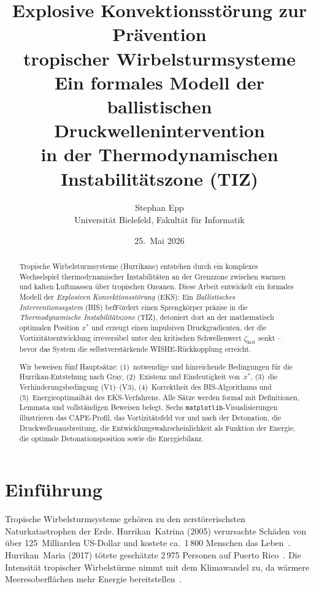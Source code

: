 ﻿\documentclass[a4paper,12pt]{article}
\title{\textbf{Explosive Konvektionsst\"{o}rung zur Pr\"{a}vention\\
tropischer Wirbelsturmsysteme}\\[0.6em]
\large Ein formales Modell der ballistischen Druckwellenintervention\\
in der Thermodynamischen Instabilit\"{a}tszone (TIZ)}
\author{Stephan Epp\\[0.3em]
\small Universit\"{a}t Bielefeld, Fakult\"{a}t f\"{u}r Informatik}
\date{25.\ Mai 2026}
\theoremstyle{definition}
\begin{document}
\maketitle

\begin{abstract}
Tropische Wirbelsturmsysteme (Hurrikane) entstehen durch ein komplexes Wechselspiel
thermodynamischer Instabilit\"{a}ten an der Grenzzone zwischen warmen und kalten
Luftmassen \"{u}ber tropischen Ozeanen.
Diese Arbeit entwickelt ein formales Modell der \emph{Explosiven Konvektionsst\"{o}rung}
(EKS): Ein \emph{Ballistisches Interventionssystem} (BIS) befF\"{o}rdert einen
Sprengk\"{o}rper pr\"{a}zise in die \emph{Thermodynamische Instabilit\"{a}tszone} (TIZ),
detoniert dort an der mathematisch optimalen Position $x^{*}$ und erzeugt einen
impulsiven Druckgradienten, der die Vortizit\"{a}tsentwicklung irreversibel unter den
kritischen Schwellenwert $\zeta_{\mathrm{krit}}$ senkt -- bevor das System die
selbstverst\"{a}rkende WISHE-R\"{u}ckkopplung erreicht.

Wir beweisen f\"{u}nf Haupts\"{a}tze: (1)~notwendige und hinreichende Bedingungen
f\"{u}r die Hurrikan-Entstehung nach Gray, (2)~Existenz und Eindeutigkeit von~$x^{*}$,
(3)~die Verhinderungsbedingung (V1)--(V3), (4)~Korrektheit des BIS-Algorithmus und
(5)~Energieoptimailt\"{a}t des EKS-Verfahrens.
Alle S\"{a}tze werden formal mit Definitionen, Lemmata und vollst\"{a}ndigen Beweisen
belegt.
Sechs \texttt{matplotlib}-Visualisierungen illustrieren das CAPE-Profil, das
Vortizit\"{a}tsfeld vor und nach der Detonation, die Druckwellenausbreitung,
die Entwicklungswahrscheinlichkeit als Funktion der Energie, die optimale
Detonationsposition sowie die Energiebilanz.
\end{abstract}

\tableofcontents
\newpage

\section{Einf\"{u}hrung}

Tropische Wirbelsturmsysteme geh\"{o}ren zu den zerst\"{o}rerischsten Naturkatastrophen
der Erde.
Hurrikan~Katrina (2005) verursachte Sch\"{a}den von \"{u}ber 125~Milliarden US-Dollar
und kostete ca.\ 1\,800 Menschen das Leben~\cite{blake2007}.
Hurrikan~Maria (2017) t\"{o}tete gesch\"{a}tzte 2\,975 Personen auf Puerto Rico~\cite{santos2018}.
Die Intensit\"{a}t tropischer Wirbelst\"{u}rme nimmt mit dem Klimawandel zu, da
w\"{a}rmere Meeresoberfl\"{a}chen mehr Energie bereitstellen~\cite{knutson2010}.
\end{document}
